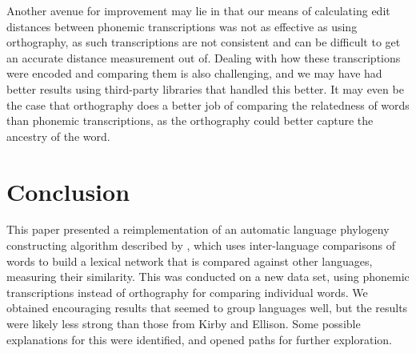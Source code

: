 \documentclass[10pt,a4]{article}
\begin{document}
Another avenue for improvement may lie in that our means of calculating edit distances between phonemic transcriptions was not as effective as using orthography, as such transcriptions are not consistent and can be difficult to get an accurate distance measurement out of.  Dealing with how these transcriptions were encoded and comparing them is also challenging, and we may have had better results using third-party libraries that handled this better.  It may even be the case that orthography does a better job of comparing the relatedness of words than phonemic transcriptions, as the orthography could better capture the ancestry of the word.

\section{Conclusion}

This paper presented a reimplementation of an automatic language phylogeny constructing algorithm described by , which uses inter-language comparisons of words to build a lexical network that is compared against other languages, measuring their similarity.  This was conducted on a new data set, using phonemic transcriptions instead of orthography for comparing individual words.  We obtained encouraging results that seemed to group languages well, but the results were likely less strong than those from Kirby and Ellison.  Some possible explanations for this were identified, and opened paths for further exploration.




\setlength{\bibleftmargin}{.125in}
\setlength{\bibindent}{-\bibleftmargin}


\end{document}
